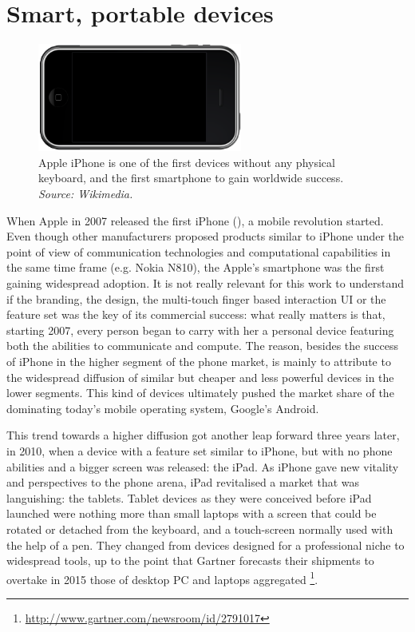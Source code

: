 \documentclass[12pt,a4paper,twoside,openright]{book}
\begin{document}
\section{Smart, portable devices}

\begin{figure}
	\centering
	\includegraphics[width=0.6\textwidth]{img/iphone}
	\caption[Apple iPhone]{Apple iPhone is one of the first devices without any physical keyboard, and the first smartphone to gain worldwide success. \emph{Source: Wikimedia.}}
	\label{img:iphone}
\end{figure}

When Apple in 2007 released the first iPhone (), a mobile revolution started.
%
Even though other manufacturers proposed products similar to iPhone under the point of view of communication technologies and computational capabilities in the same time frame (e.g. Nokia N810), the Apple's smartphone was the first gaining widespread adoption.
%
It is not really relevant for this work to understand if the branding, the design, the multi-touch finger based interaction UI or the feature set was the key of its commercial success: what really matters is that, starting 2007, every person began to carry with her a personal device featuring both the abilities to communicate and compute.
%
The reason, besides the success of iPhone in the higher segment of the phone market, is mainly to attribute to the widespread diffusion of similar but cheaper and less powerful devices in the lower segments.
%
This kind of devices ultimately pushed the market share of the dominating today's mobile operating system, Google's Android.

This trend towards a higher diffusion got another leap forward three years later, in 2010, when a device with a feature set similar to iPhone, but with no phone abilities  and a bigger screen was released: the iPad.
%
As iPhone gave new vitality and perspectives to the phone arena, iPad revitalised a market that was languishing: the tablets.
%
Tablet devices as they were conceived before iPad launched were nothing more than small laptops with a screen that could be rotated or detached from the keyboard, and a touch-screen normally used with the help of a pen.
%
They changed from devices designed for a professional niche to widespread tools, up to the point that Gartner forecasts their shipments to overtake in 2015 those of desktop PC and laptops aggregated \footnote{\url{http://www.gartner.com/newsroom/id/2791017}}.
\end{document}
